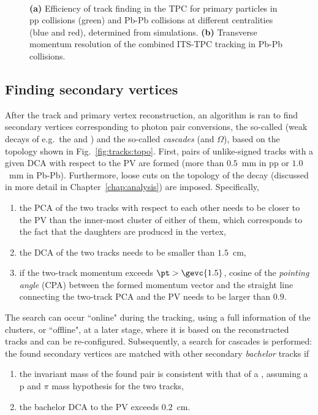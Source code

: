 \begin{figure}[!h]
\hspace{1em}
\\
\caption{\textbf{(a)} Efficiency of track finding in the TPC for primary particles in pp collisions (green) and Pb-Pb collisions at different centralities (blue and red), determined from simulations. \cite{alicecollaborationPerformanceALICEExperiment2014} \textbf{(b)} Transverse momentum resolution of the combined ITS-TPC tracking in Pb-Pb collisions. \cite{continPerformancePresentALICE2012}}
\label{fig:tracks:pres}
\end{figure}

\subsection{Finding secondary vertices}

After the track and primary vertex reconstruction, an algorithm is ran to find secondary vertices corresponding to photon pair conversions, the so-called \VOs (weak decays of e.g.\ the \KOs and \LA) and the so-called \textit{cascades} (\XI and $\Omega$),  based on the topology shown in Fig.~\ref{fig:tracks:topo}. First, pairs of unlike-signed tracks with a given DCA with respect to the PV are formed (more than $0.5$~mm in pp or $1.0$~mm in Pb-Pb). Furthermore, loose cuts on the topology of the decay (discussed in more detail in Chapter~\ref{chap:analysis}) are imposed. Specifically, 
\begin{enumerate}
\item the PCA of the two tracks with respect to each other needs to be closer to the PV than the inner-most cluster of either of them, which corresponds to the fact that the daughters are produced in the vertex,
\item the DCA of the two tracks needs to be smaller than $1.5$~cm,
\item if the two-track momentum exceeds $\pt>\gevc{1.5}$, cosine of the \textit{pointing angle} (CPA) between the formed momentum vector and the straight line connecting the two-track PCA and the PV needs to be larger than $0.9$.
\end{enumerate}

The \VOs search can occur ``online" during the tracking, using a full information of the clusters, or ``offline", at a later stage, where it is based on the reconstructed tracks and can be re-configured. Subsequently, a search for cascades is performed: the found secondary vertices are matched with other secondary \textit{bachelor} tracks if
\begin{enumerate}
\item the invariant mass of the found pair is consistent with that of a \LA, assuming a p and $\pi$ mass hypothesis for the two tracks,
\item the bachelor DCA to the PV exceeds $0.2$~cm.
\end{enumerate}

